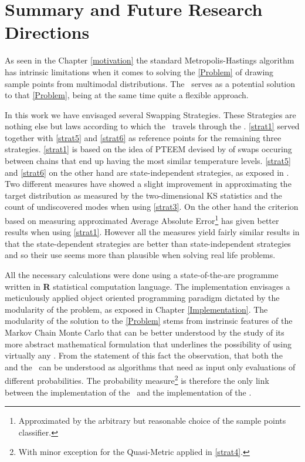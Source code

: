 \chapter*{Summary and Future Research Directions}

As seen in the Chapter \ref{motivation} the standard Metropolis-Hastings algorithm has intrinsic limitations when it comes to solving the \ref{Problem} of drawing sample points from multimodal distributions. The \PT\, serves as a potential solution to that \ref{Problem}, being at the same time quite a flexible approach. 

In this work we have envisaged several Swapping Strategies. These Strategies are nothing else but laws according to which the \PT\, travels through the \sspace. \ref{strat1} served together with \ref{strat5} and \ref{strat6} as reference points for the remaining three strategies. \ref{strat1} is based on the idea of \textsc{PTEEM} devised by \citet{BaragattiParallelTemperingWithEquiEnergyMoves} of swaps occuring between chains that end up having the most similar temperature levels. \ref{strat5} and \ref{strat6} on the other hand are state-independent strategies, as exposed in \citet{BM2}. Two different measures have showed a slight improvement in approximating the target distribution as measured by the two-dimensional \textsc{KS} statistics and the count of undiscovered modes when using \ref{strat3}. On the other hand the criterion based on measuring approximated Average Absolute Error\footnote{Approximated by the arbitrary but reasonable choice of the sample points classifier.} has given better results when using \ref{strat1}. However all the measures yield fairly similar results in that the state-dependent strategies are better than state-independent strategies and so their use seems more than plausible when solving real life problems. 

All the necessary calculations were done using a state-of-the-are programme written in \textbf{R} statistical computation language. The implementation envisages a meticulously applied object oriented programming paradigm dictated by the modularity of the problem, as exposed in Chapter \ref{Implementation}. The modularity of the solution to the \ref{Problem} stems from instrinsic features of the Markov Chain Monte Carlo that can be better understood by the study of its more abstract mathematical formulation that underlines the possibility of using virtually any \sspace. From the statement of this fact the observation, that both the \MH\, and the \PT\, can be understood as algorithms that need as input only evaluations of different probabilities. The probability measure\footnote{With minor exception for the Quasi-Metric applied in \ref{strat4}.} is therefore the only link between the implementation of the \sspace\, and the implementation of the \algo. 

